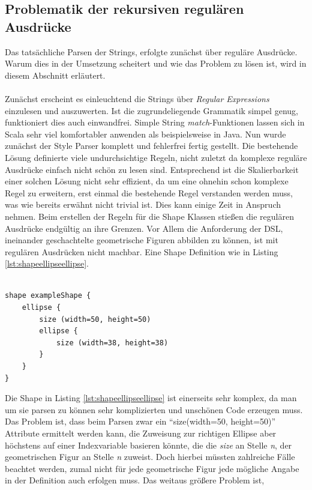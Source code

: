 \subsection{Problematik der rekursiven regulären Ausdrücke}
Das tatsächliche Parsen der Strings, erfolgte zunächst über reguläre Ausdrücke. Warum dies in der Umsetzung scheitert und wie das Problem zu lösen ist, wird in diesem Abschnitt erläutert.\\\\Zunächst erscheint es einleuchtend die Strings über \textit{Regular Expressions} einzulesen und auszuwerten. Ist die zugrundeliegende Grammatik simpel genug, funktioniert dies auch einwandfrei. Simple String \textit{match}-Funktionen lassen sich in Scala sehr viel komfortabler anwenden als beispielsweise in Java. Nun wurde zunächst der Style Parser komplett und fehlerfrei fertig gestellt. Die bestehende Lösung definierte viele undurchsichtige Regeln, nicht zuletzt da komplexe reguläre Ausdrücke einfach nicht schön zu lesen sind. Entsprechend ist die Skalierbarkeit einer solchen Lösung nicht sehr effizient, da um eine ohnehin schon komplexe Regel zu erweitern, erst einmal die bestehende Regel verstanden werden muss, was wie bereits erwähnt nicht trivial ist. Dies kann einige Zeit in Anspruch nehmen. Beim erstellen der Regeln für die Shape Klassen stießen die regulären Ausdrücke endgültig an ihre Grenzen. Vor Allem die Anforderung der DSL, ineinander geschachtelte geometrische Figuren abbilden zu können, ist mit regulären Ausdrücken nicht machbar. Eine Shape Definition wie in Listing \ref{lst:shapeellipseellipse}.\\\\
\begin{lstlisting}[style=spray, caption = {Beispielhafte Shapedefinition}, label = {lst:shapeellipseellipse}]
shape exampleShape {
    ellipse {
        size (width=50, height=50)
        ellipse {
            size (width=38, height=38)
        }
    }
}
\end{lstlisting} Die Shape in Listing \ref{lst:shapeellipseellipse} ist einerseits sehr komplex, da man um sie parsen zu können sehr komplizierten und unschönen Code erzeugen muss. Das Problem ist, dass beim Parsen zwar ein "`size(width=50, height=50)"' Attribute ermittelt werden kann, die Zuweisung zur richtigen Ellipse aber höchstens auf einer Indexvariable basieren könnte, die die \textit{size} an Stelle \textit{n}, der geometrischen Figur an Stelle \textit{n} zuweist. Doch hierbei müssten zahlreiche Fälle beachtet werden, zumal nicht für jede geometrische Figur jede mögliche Angabe in der Definition auch erfolgen muss. Das weitaus größere Problem ist,
